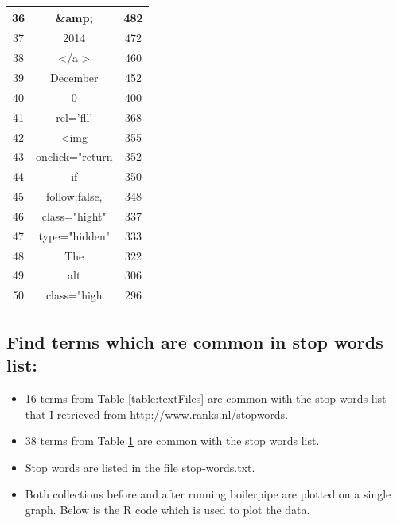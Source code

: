 \begin{table}
\begin{center}
\begin{tabular}{ c | c | c }
36 &\&amp; &482\\ \hline
37 &2014 &472\\ \hline
38 & \textless /a \textgreater &460\\ \hline
39 &December &452\\ \hline
40 &0 &400\\ \hline
41 &rel='fll' &368\\ \hline
42 &\textless img &355\\ \hline
43 &onclick="return &352\\ \hline
44 &if &350\\ \hline
45 & follow:false,&348\\ \hline
46 &class="hight" &337\\ \hline
47 &type="hidden" &333\\ \hline
48 &The &322\\ \hline
49 &alt &306\\ \hline
50&class="high &296\\ \hline
    \hline
  \end{tabular}
\end{center}
\label{table:htmlFiles}
\end{table}

\subsection{Find terms which are common in stop words list:}

\begin{itemize}
\item 16 terms from Table \ref{table:textFiles} are common with the stop words list that I retrieved from \url{http://www.ranks.nl/stopwords}.
\item 38 terms from Table \ref{table:htmlFiles} are common with the stop words list. 
\item Stop words are listed in the file stop-words.txt.
\item Both collections before and after running boilerpipe are plotted on a single graph.
Below is the R code which is used to plot the data.
\end{itemize}




